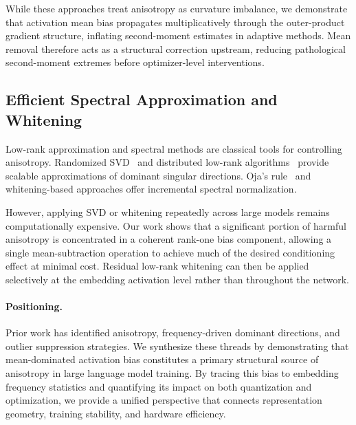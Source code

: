While these approaches treat anisotropy as curvature imbalance,
we demonstrate that activation mean bias propagates multiplicatively
through the outer-product gradient structure,
inflating second-moment estimates in adaptive methods.
Mean removal therefore acts as a structural correction upstream,
reducing pathological second-moment extremes before optimizer-level
interventions.

\subsection{Efficient Spectral Approximation and Whitening}

Low-rank approximation and spectral methods are classical tools for
controlling anisotropy.
Randomized SVD~\cite{halko2011randomized} and distributed low-rank
algorithms~\cite{suresh2017distributed}
provide scalable approximations of dominant singular directions.
Oja’s rule~\cite{oja1982pca} and whitening-based approaches
\cite{huang2021whiteningbert}
offer incremental spectral normalization.

However, applying SVD or whitening repeatedly across large models
remains computationally expensive.
Our work shows that a significant portion of harmful anisotropy
is concentrated in a coherent rank-one bias component,
allowing a single mean-subtraction operation to achieve much of the
desired conditioning effect at minimal cost.
Residual low-rank whitening can then be applied selectively at the
embedding activation level rather than throughout the network.

\paragraph{Positioning.}
Prior work has identified anisotropy, frequency-driven dominant directions,
and outlier suppression strategies.
We synthesize these threads by demonstrating that
mean-dominated activation bias constitutes a primary structural source
of anisotropy in large language model training.
By tracing this bias to embedding frequency statistics and quantifying its
impact on both quantization and optimization,
we provide a unified perspective that connects representation geometry,
training stability, and hardware efficiency.